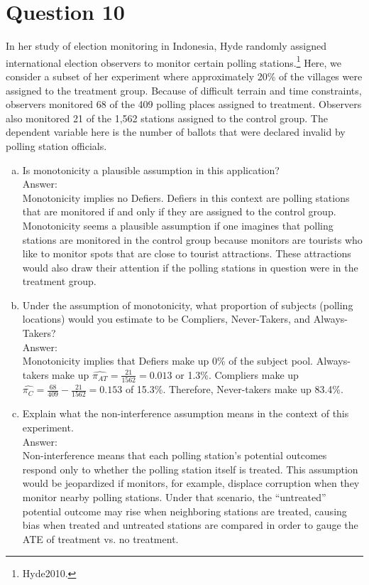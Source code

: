 \documentclass[11pt,notitlepage]{article}\usepackage[]{graphicx}\usepackage[]{color}
\begin{document}
\section*{Question 10}
In her study of election monitoring in Indonesia, Hyde randomly assigned international election observers to monitor certain polling stations.\footnote{Hyde2010.} Here, we consider a subset of her experiment where approximately 20\% of the villages were assigned to the treatment group. Because of difficult terrain and time constraints, observers monitored 68 of the 409 polling places assigned to treatment. Observers also monitored 21 of the 1,562 stations assigned to the control group. The dependent variable here is the number of ballots that were declared invalid by polling station officials.
\begin{enumerate}[a)]
\item Is monotonicity a plausible assumption in this application? \\
Answer:\\
Monotonicity implies no Defiers. Defiers in this context are polling stations that are monitored if and only if they are assigned to the control group. Monotonicity seems a plausible assumption if one imagines that polling stations are monitored in the control group because monitors are tourists who like to monitor spots that are close to tourist attractions. These attractions would also draw their attention if the polling stations in question were in the treatment group.
\item Under the assumption of monotonicity, what proportion of subjects (polling locations) would you estimate to be Compliers, Never-Takers, and Always-Takers?\\
Answer:\\
Monotonicity implies that Defiers make up 0\% of the subject pool. Always-takers make up $\hat{\pi_{AT}}=\frac{21}{1562}=0.013$ or 1.3\%. Compliers make up $\hat{\pi_{C}}=\frac{68}{409}-\frac{21}{1562}=0.153$ of 15.3\%. Therefore, Never-takers make up 83.4\%.
\item Explain what the non-interference assumption means in the context of this experiment.\\
Answer:\\
Non-interference means that each polling station's potential outcomes respond only to whether the polling station itself is treated. This assumption would be jeopardized if monitors, for example, displace corruption when they monitor nearby polling stations. Under that scenario, the ``untreated'' potential outcome may rise when neighboring stations are treated, causing bias when treated and untreated stations are compared in order to gauge the ATE of treatment vs. no treatment.


\end{enumerate}
\end{document}
